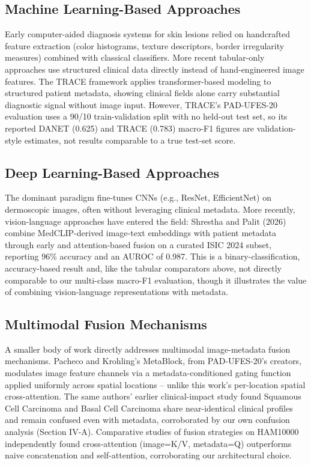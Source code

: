 \documentclass[conference]{IEEEtran}
\begin{document}
\subsection{Machine Learning-Based Approaches}
Early computer-aided diagnosis systems for skin lesions relied on handcrafted feature extraction (color histograms, texture descriptors, border irregularity measures) combined with classical classifiers. More recent tabular-only approaches use structured clinical data directly instead of hand-engineered image features. The TRACE framework applies transformer-based modeling to structured patient metadata, showing clinical fields alone carry substantial diagnostic signal without image input. However, TRACE's PAD-UFES-20 evaluation uses a 90/10 train-validation split with no held-out test set, so its reported DANET (0.625) and TRACE (0.783) macro-F1 figures are validation-style estimates, not results comparable to a true test-set score.

\subsection{Deep Learning-Based Approaches}
The dominant paradigm fine-tunes CNNs (e.g., ResNet, EfficientNet) on dermoscopic images, often without leveraging clinical metadata. More recently, vision-language approaches have entered the field: Shrestha and Palit (2026) combine MedCLIP-derived image-text embeddings with patient metadata through early and attention-based fusion on a curated ISIC 2024 subset, reporting 96\% accuracy and an AUROC of 0.987. This is a binary-classification, accuracy-based result and, like the tabular comparators above, not directly comparable to our multi-class macro-F1 evaluation, though it illustrates the value of combining vision-language representations with metadata.

\subsection{Multimodal Fusion Mechanisms}
A smaller body of work directly addresses multimodal image-metadata fusion mechanisms. Pacheco and Krohling's MetaBlock, from PAD-UFES-20's creators, modulates image feature channels via a metadata-conditioned gating function applied uniformly across spatial locations -- unlike this work's per-location spatial cross-attention. The same authors' earlier clinical-impact study found Squamous Cell Carcinoma and Basal Cell Carcinoma share near-identical clinical profiles and remain confused even with metadata, corroborated by our own confusion analysis (Section IV-A). Comparative studies of fusion strategies on HAM10000 independently found cross-attention (image=K/V, metadata=Q) outperforms naive concatenation and self-attention, corroborating our architectural choice.
\end{document}
